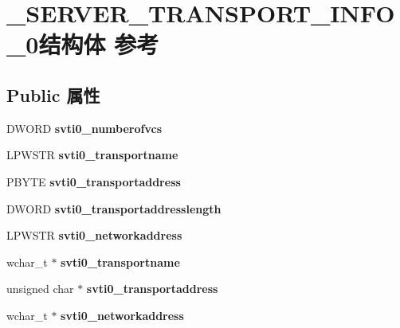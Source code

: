 \hypertarget{struct___s_e_r_v_e_r___t_r_a_n_s_p_o_r_t___i_n_f_o__0}{}\section{\+\_\+\+S\+E\+R\+V\+E\+R\+\_\+\+T\+R\+A\+N\+S\+P\+O\+R\+T\+\_\+\+I\+N\+F\+O\+\_\+0结构体 参考}
\label{struct___s_e_r_v_e_r___t_r_a_n_s_p_o_r_t___i_n_f_o__0}
\subsection*{Public 属性}
\begin{DoxyCompactItemize}
\item 
\mbox{\label{struct___s_e_r_v_e_r___t_r_a_n_s_p_o_r_t___i_n_f_o__0_af008b8694536de68948237656501c764}} 
D\+W\+O\+RD {\bfseries svti0\+\_\+numberofvcs}
\item 
\mbox{\label{struct___s_e_r_v_e_r___t_r_a_n_s_p_o_r_t___i_n_f_o__0_a8acc1ae6955b9050370b58e9c1414a68}} 
L\+P\+W\+S\+TR {\bfseries svti0\+\_\+transportname}
\item 
\mbox{\label{struct___s_e_r_v_e_r___t_r_a_n_s_p_o_r_t___i_n_f_o__0_a528c403b924c2188605b2143c6bd6f6b}} 
P\+B\+Y\+TE {\bfseries svti0\+\_\+transportaddress}
\item 
\mbox{\label{struct___s_e_r_v_e_r___t_r_a_n_s_p_o_r_t___i_n_f_o__0_a5b4b7c42ba151449ebb0083c37f9f038}} 
D\+W\+O\+RD {\bfseries svti0\+\_\+transportaddresslength}
\item 
\mbox{\label{struct___s_e_r_v_e_r___t_r_a_n_s_p_o_r_t___i_n_f_o__0_a56bf5319c899d13fb7a6490ba6ca32e5}} 
L\+P\+W\+S\+TR {\bfseries svti0\+\_\+networkaddress}
\item 
\mbox{\label{struct___s_e_r_v_e_r___t_r_a_n_s_p_o_r_t___i_n_f_o__0_aada3bd25ba389046c2b05ba0ae34fc6c}} 
wchar\+\_\+t $\ast$ {\bfseries svti0\+\_\+transportname}
\item 
\mbox{\label{struct___s_e_r_v_e_r___t_r_a_n_s_p_o_r_t___i_n_f_o__0_a577d4818858117ee4630f82b828375d8}} 
unsigned char $\ast$ {\bfseries svti0\+\_\+transportaddress}
\item 
\mbox{\label{struct___s_e_r_v_e_r___t_r_a_n_s_p_o_r_t___i_n_f_o__0_a022ec319b978124caa2da0684cf1eabb}} 
wchar\+\_\+t $\ast$ {\bfseries svti0\+\_\+networkaddress}
\end{DoxyCompactItemize}


